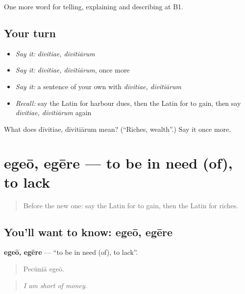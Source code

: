 \begin{grammarlens}[title={What you've built}]
One more word for telling, explaining and describing at B1.
\end{grammarlens}

\subsection*{Your turn}
\begin{itemize}
\raggedright
  \item \emph{Say it:} \emph{dīvitiae, dīvitiārum}
  \item \emph{Say it:} \emph{dīvitiae, dīvitiārum}, once more
  \item \emph{Say it:} a sentence of your own with \emph{dīvitiae, dīvitiārum}
  \item \emph{Recall:} say the Latin for harbour dues, then the Latin for to gain, then say \emph{dīvitiae, dīvitiārum} again
\end{itemize}

\begin{tcolorbox}[breakable,colback=teal!4,colframe=teal!35!black,title={Before you move on}]
What does dīvitiae, dīvitiārum mean? (\textquotedblleft{}Riches, wealth\textquotedblright{}.) Say it once more.
\end{tcolorbox}
\section[egeō, egēre]{egeō, egēre — to be in need (of), to lack}

\label{lesson:LA-C422-egeo}



\begin{quote}
Before the new one: say the Latin for to gain, then the Latin for riches.
\end{quote}

\subsection*{You'll want to know: egeō, egēre}
\textbf{egeō, egēre} — \textquotedblleft{}to be in need (of), to lack\textquotedblright{}.

\begin{quote}
Pecūniā egeō.
\end{quote}

\begin{quote}
\emph{I am short of money.}
\end{quote}

